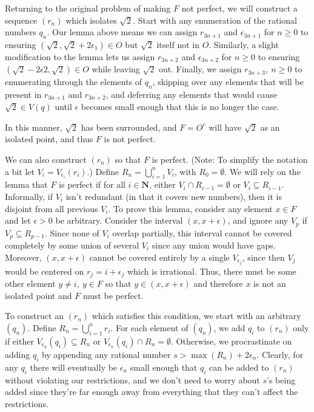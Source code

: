 \begin{solution}
{  Returning to the original problem of making \(F\) not perfect, we will construct a sequence \((r_n)\) which isolates \(\sqrt{2}\). Start with any enumeration of the rational numbers \(q_n\). Our lemma above means we can assign \(r_{3n + 1}\) and \(\epsilon_{3n + 1}\) for \(n \geq 0\) to ensuring \((\sqrt{2}, \sqrt{2} + 2\epsilon_1) \in O\) but \(\sqrt{2}\) itself not in \(O\). Similarly, a slight modification to the lemma lets us assign \(r_{3n + 2}\) and \(\epsilon_{3n + 2}\) for \(n \geq 0\) to ensuring \((\sqrt{2} - 2 \epsilon{2}, \sqrt{2}) \in O\) while leaving \(\sqrt{2}\) out. Finally, we assign \(r_{3n+3},\ n \geq 0\) to enumerating through the elements of \(q_n\), skipping over any elements that will be present in \(r_{3n + 1}\) and \(r_{3n + 2}\), and deferring any elements that would cause \(\sqrt{2} \in V(q)\) until \(\epsilon\) becomes small enough that this is no longer the case.

  In this manner, \(\sqrt{2}\) has been surrounded, and \(F= O^c\) will have \(\sqrt{2}\) as an isolated point, and thus \(F\) is not perfect.

We can also construct \((r_n)\) so that \(F\) is perfect. (Note: To simplify the notation a bit let \(V_i = V_{\epsilon_i}(r_i)\).) Define \(R_n = \bigcup^n_{i=1} V_i\), with \(R_0 = \emptyset\). We will rely on the lemma that \(F\) is perfect if for all \(i \in \mathbf{N}\), either \(V_i \cap R_{i-1} = \emptyset\) or \(V_i \subseteq R_{i-1}\). Informally, if \(V_i\) isn't redundant (in that it covers new numbers), then it is disjoint from all previous \(V_i\). To prove this lemma, consider any element \(x \in F\) and let \(\epsilon >0\) be arbitrary. Consider the interval \((x, x + \epsilon)\), and ignore any \(V_p\) if \(V_p \subseteq R_{p-1}\). Since none of \(V_i\) overlap partially, this interval cannot be covered completely by some union of several \(V_i\) since any union would have gaps. Moreover, \((x, x + \epsilon)\) cannot be covered entirely by a single \(V_{\epsilon_j}\), since then \(V_j\) would be centered on \(r_j = i + \epsilon_j\) which is irrational. Thus, there must be some other element \(y \neq i,\ y\in F\) so that \(y \in (x, x + \epsilon)\) and therefore \(x\) is not an isolated point and \(F\) must be perfect.

To construct an \((r_n)\) which satisfies this condition, we start with an arbitrary \((q_n)\). Define \(R_n = \bigcup^n_{i=1} r_i\). For each element of \((q_n)\), we add \(q_i\) to \((r_n)\) only if either \(V_{\epsilon_n}(q_i) \subseteq R_n\) or \(V_{\epsilon_n}(q_i) \cap R_n = \emptyset\). Otherwise, we procrastinate on adding \(q_i\) by appending any rational number \(s > \max(R_n) + 2 \epsilon_n\). Clearly, for any \(q_i\) there will eventually be \(\epsilon_n\) small enough that \(q_i\) can be added to \((r_n)\) without violating our restrictions, and we don't need to worry about \(s\)'s being added since they're far enough away from everything that they can't affect the restrictions.

  }

\end{solution}

